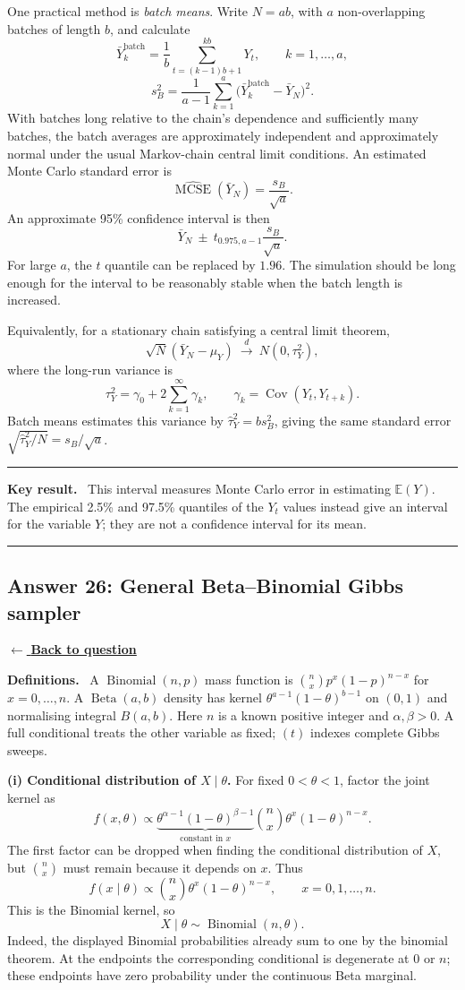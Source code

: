 \documentclass[11pt,a4paper]{article}
\newcommand{\E}{\mathbb{E}}
\newcommand{\answernav}[1]{%
  \label{answer:#1}%
  \noindent\hyperref[question:#1]{$\leftarrow$ \textbf{Back to question}}%
  \par\smallskip}
\newcommand{\studyheading}[1]{%
  \par\medskip\noindent\textcolor{statblue}{\textbf{#1.}}\ }
\newenvironment{keyresult}
  {\begin{center}\begin{minipage}{0.92\linewidth}\color{statblue}%
   \hrule\vspace{6pt}\textbf{Key result.}\ }
  {\vspace{6pt}\hrule\end{minipage}\end{center}}
\begin{document}
One practical method is \emph{batch means}. Write $N=ab$, with $a$
non-overlapping batches of length $b$, and calculate
\[
\bar Y_k^{\mathrm{batch}}=
\frac1b\sum_{t=(k-1)b+1}^{kb}Y_t,\qquad k=1,\ldots,a,
\]
\[
s_B^2=\frac1{a-1}\sum_{k=1}^{a}
\bigl(\bar Y_k^{\mathrm{batch}}-\bar Y_N\bigr)^2.
\]
With batches long relative to the chain's dependence and sufficiently many
batches, the batch averages are approximately independent and approximately
normal under the usual Markov-chain central limit conditions. An estimated
Monte Carlo standard error is
\[
\widehat{\operatorname{MCSE}}(\bar Y_N)=\frac{s_B}{\sqrt a}.
\]
An approximate 95\% confidence interval is then
\[
\boxed{\bar Y_N\ \pm\ t_{0.975,a-1}\frac{s_B}{\sqrt a}.}
\]
For large $a$, the $t$ quantile can be replaced by $1.96$. The simulation
should be long enough for the interval to be reasonably stable when the
batch length is increased.

Equivalently, for a stationary chain satisfying a central limit theorem,
\[
\sqrt N(\bar Y_N-\mu_Y)\ \xrightarrow{d}\ N(0,\tau_Y^2),
\]
where the long-run variance is
\[
\tau_Y^2=\gamma_0+2\sum_{k=1}^{\infty}\gamma_k,
\qquad \gamma_k=\operatorname{Cov}(Y_t,Y_{t+k}).
\]
Batch means estimates this variance by $\widehat\tau_Y^2=b s_B^2$, giving
the same standard error $\sqrt{\widehat\tau_Y^2/N}=s_B/\sqrt a$.

\begin{keyresult}
This interval measures Monte Carlo error in estimating $\E(Y)$.
The empirical 2.5\% and 97.5\% quantiles of the $Y_t$ values instead give
an interval for the variable $Y$; they are not a confidence interval for its mean.
\end{keyresult}

\clearpage

\subsection{Answer 26: General Beta--Binomial Gibbs sampler}
\answernav{26}

\studyheading{Definitions}
A $\operatorname{Binomial}(n,p)$ mass function is
$\binom nx p^x(1-p)^{n-x}$ for $x=0,\ldots,n$.
A $\operatorname{Beta}(a,b)$ density has kernel
$\theta^{a-1}(1-\theta)^{b-1}$ on $(0,1)$ and normalising integral $B(a,b)$.
Here $n$ is a known positive integer and $\alpha,\beta>0$.
A full conditional treats the other variable as fixed; $(t)$ indexes complete Gibbs sweeps.

\textbf{(i) Conditional distribution of $X\mid\theta$.}
For fixed $0<\theta<1$, factor the joint kernel as
\[
f(x,\theta)\propto
\underbrace{\theta^{\alpha-1}(1-\theta)^{\beta-1}}_{\text{constant in }x}
\binom nx\theta^x(1-\theta)^{n-x}.
\]
The first factor can be dropped when finding the conditional distribution
of $X$, but $\binom nx$ must remain because it depends on $x$. Thus
\[
f(x\mid\theta)\propto\binom nx\theta^x(1-\theta)^{n-x},
\qquad x=0,1,\ldots,n.
\]
This is the Binomial kernel, so
\[
\boxed{X\mid\theta\sim\operatorname{Binomial}(n,\theta).}
\]
Indeed, the displayed Binomial probabilities already sum to one by the
binomial theorem. At the endpoints the corresponding conditional is
degenerate at $0$ or $n$; these endpoints have zero probability under the
continuous Beta marginal.
\end{document}

